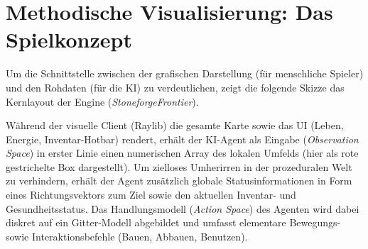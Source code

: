 \documentclass[12pt,a4paper]{article}
\begin{document}
\section{Methodische Visualisierung: Das Spielkonzept}
Um die Schnittstelle zwischen der grafischen Darstellung (f\"ur menschliche Spieler) und den Rohdaten (f\"ur die KI) zu verdeutlichen, zeigt die folgende Skizze das Kernlayout der Engine (\textit{StoneforgeFrontier}). 

W\"ahrend der visuelle Client (Raylib) die gesamte Karte sowie das UI (Leben, Energie, Inventar-Hotbar) rendert, erh\"alt der KI-Agent als Eingabe (\textit{Observation Space}) in erster Linie einen numerischen Array des lokalen Umfelds (hier als rote gestrichelte Box dargestellt). Um zielloses Umherirren in der prozeduralen Welt zu verhindern, erh\"alt der Agent zus\"atzlich globale Statusinformationen in Form eines Richtungsvektors zum Ziel sowie den aktuellen Inventar- und Gesundheitsstatus. Das Handlungsmodell (\textit{Action Space}) des Agenten wird dabei diskret auf ein Gitter-Modell abgebildet und umfasst elementare Bewegungs- sowie Interaktionsbefehle (Bauen, Abbauen, Benutzen).
\end{document}
